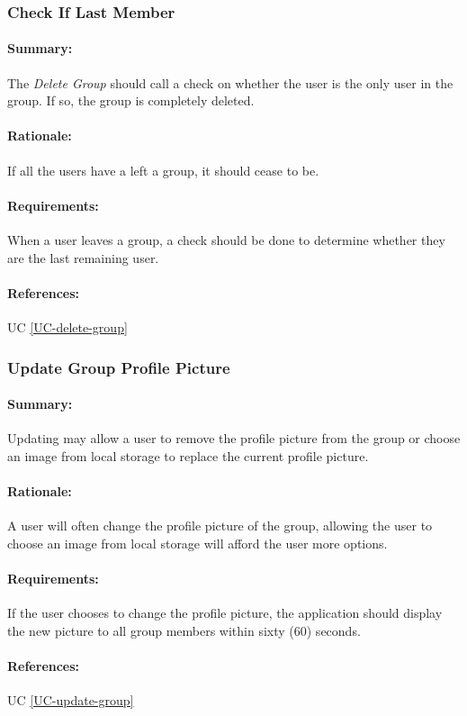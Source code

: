 \documentclass[11pt]{article}
\begin{document}
\subsubsection{Check If Last Member} \label{FR-Check-Last-User}
\paragraph{Summary:} The \textit{Delete Group} should call a check on whether the user is the only user in the group. If so, the group is completely deleted.
\paragraph{Rationale:} If all the users have a left a group, it should cease to be.
\paragraph{Requirements:} When a user leaves a group, a check should be done to determine whether they are the last remaining user.
\paragraph{References:} UC \ref{UC-delete-group}

\subsubsection{Update Group Profile Picture} \label{FR-update-group-picture}
\paragraph{Summary:}
Updating may allow a user to remove the profile picture from the group or choose an image from local storage to replace the current profile picture.
\paragraph{Rationale:}
A user will often change the profile picture of the group, allowing the user to choose an image from local storage will afford the user more options.
\paragraph{Requirements:}
If the user chooses to change the profile picture, the application should display the new picture to all group members within sixty (60) seconds.
\paragraph{References:} UC \ref{UC-update-group}
\end{document}
